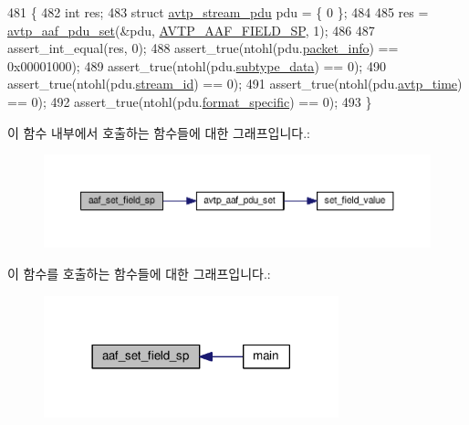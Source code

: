 \begin{DoxyCode}
481 \{
482     \textcolor{keywordtype}{int} res;
483     \textcolor{keyword}{struct }\hyperlink{structavtp__stream__pdu}{avtp\_stream\_pdu} pdu = \{ 0 \};
484 
485     res = \hyperlink{avtp__aaf_8h_af242dc7ed6c5ca5ea8e9d5071c13e19d}{avtp\_aaf\_pdu\_set}(&pdu, \hyperlink{avtp__aaf_8h_a7eaee6c1ebc806c0401dbe7b14cd22dba79d34018cdf39cf46998df2bc16e7617}{AVTP\_AAF\_FIELD\_SP}, 1);
486 
487     assert\_int\_equal(res, 0);
488     assert\_true(ntohl(pdu.\hyperlink{structavtp__stream__pdu_a737b6c4ff9f6954da39283e7351cbf58}{packet\_info}) == 0x00001000);
489     assert\_true(ntohl(pdu.\hyperlink{structavtp__stream__pdu_a3210e9f18fdc9c29cef7600c4d1e67e9}{subtype\_data}) == 0);
490     assert\_true(ntohl(pdu.\hyperlink{structavtp__stream__pdu_af5af7b461263e29ceb91a8d3a8bc2c97}{stream\_id}) == 0);
491     assert\_true(ntohl(pdu.\hyperlink{structavtp__stream__pdu_a81ec49d93f7a916531f4d97214f47515}{avtp\_time}) == 0);
492     assert\_true(ntohl(pdu.\hyperlink{structavtp__stream__pdu_acbfc36b550978f88cf0a3d9d2b2ce0dd}{format\_specific}) == 0);
493 \}
\end{DoxyCode}


이 함수 내부에서 호출하는 함수들에 대한 그래프입니다.\+:
\nopagebreak
\begin{figure}[H]
\begin{center}
\leavevmode
\includegraphics[width=350pt]{test-aaf_8c_a3c314045d45a46992a9e96877febd815_cgraph}
\end{center}
\end{figure}




이 함수를 호출하는 함수들에 대한 그래프입니다.\+:
\nopagebreak
\begin{figure}[H]
\begin{center}
\leavevmode
\includegraphics[width=242pt]{test-aaf_8c_a3c314045d45a46992a9e96877febd815_icgraph}
\end{center}
\end{figure}


